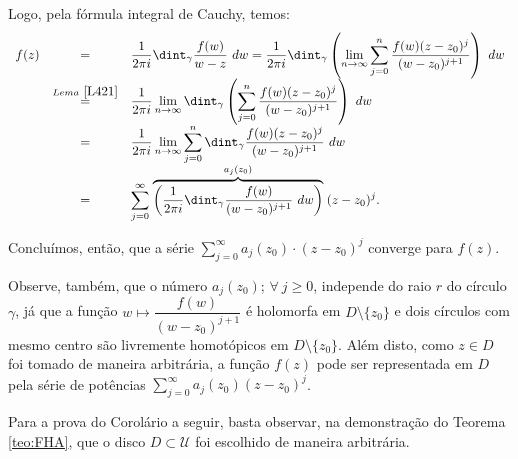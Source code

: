 {Logo, pela fórmula integral de Cauchy, temos:
$$\begin{array}{rcl}
f(z)
&=& \dfrac{1}{2 \pi i} \dint_{\gamma} \dfrac{f(w)}{w-z} ~dw
= \dfrac{1}{2 \pi i} \dint_{\gamma} \left(\displaystyle\lim_{n \to \infty} \displaystyle\sum_{j=0}^n{\dfrac{f(w)(z-z_0)^j}{(w-z_0)^{j+1}}}\right) ~dw \\
&\stackrel{Lema~\ref{L421}}{=}& \dfrac{1}{2 \pi i} \displaystyle\lim_{n \to \infty} \dint_{\gamma} \left(\displaystyle\sum_{j=0}^n {\dfrac{f(w)(z- z_0)^j}{(w-z_0)^{j+1}}}\right) ~dw \\
&=& \dfrac{1}{2 \pi i} \displaystyle\lim_{n \to \infty} \displaystyle\sum_{j=0}^n \dint_{\gamma} \dfrac{f(w)(z-z_0)^j}{(w-z_0)^{j+1}} ~dw \\
&=& \displaystyle\sum_{j=0}^{\infty}\stackrel{a_j(z_0)}{\overbrace{\left(\dfrac{1}{2 \pi i} \dint_{\gamma} \dfrac{f(w)}{(w-z_0)^{j+1}} ~dw \right)}}(z-z_0)^j.
\end{array}$$

Concluímos, então, que a série $\displaystyle\sum_{j=0}^{\infty} a_j(z_0) \cdot (z-z_0)^j$ converge para $f(z)$.

Observe, também, que o número $a_j(z_0)$; $\forall\ j \geq 0$, independe do raio $r$ do círculo $\gamma$, já que a função $w \mapsto \dfrac{f(w)}{(w-z_0)^{j+1}}$ é holomorfa em $D\setminus \{z_0\}$ e dois círculos com mesmo centro são livremente homotópicos em $D \setminus \{z_0\}$. Além disto, como $z \in D$ foi tomado de maneira arbitrária, a função $f(z)$ pode ser representada em $D$ pela série de potências $\displaystyle\sum_{j=0}^{\infty} a_j(z_0) (z-z_0)^j$.
}


Para a prova do Corolário a seguir, basta observar, na demonstração do Teorema \ref{teo:FHA}, que o disco $D \subset \mathcal{U}$ foi escolhido de maneira arbitrária.







